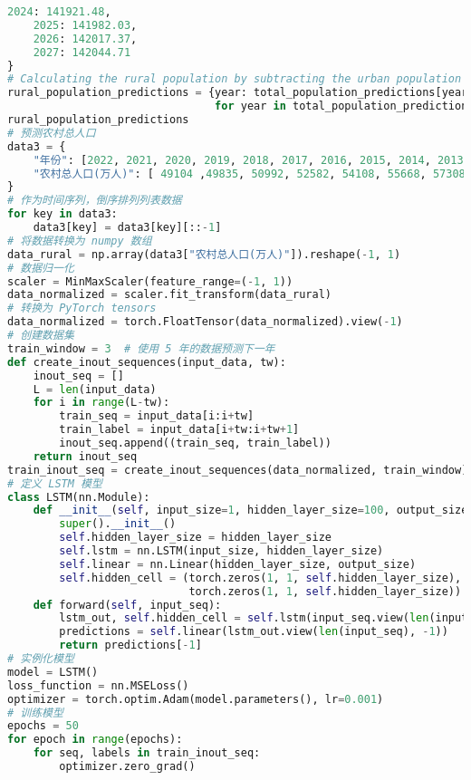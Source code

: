 \begin{lstlisting}[language=python,caption={城乡人口}]
    2024: 141921.48,
    2025: 141982.03,
    2026: 142017.37,
    2027: 142044.71
}
# Calculating the rural population by subtracting the urban population from the total population
rural_population_predictions = {year: total_population_predictions[year] - urban_population_predictions[year] 
                                for year in total_population_predictions}
rural_population_predictions
# 预测农村总人口
data3 = {
    "年份": [2022, 2021, 2020, 2019, 2018, 2017, 2016, 2015, 2014, 2013, 2012, 2011, 2010, 2009, 2008, 2007, 2006, 2005, 2004, 2003, 2002, 2001, 2000, 1999, 1998, 1997, 1996, 1995, 1994, 1993, 1992, 1991, 1990],
    "农村总人口(万人)": [ 49104 ,49835, 50992, 52582, 54108, 55668, 57308, 59024 ,60908, 62224 ,63747 ,64989 ,67113 ,68938 ,70399 ,71496 ,73160 ,74544 ,75705 ,76851 ,78241 ,79563 ,80837 ,82038 ,83153 ,84177 ,85085 ,85947 ,85681 ,85344 ,84996 ,84620, 84138],
}
# 作为时间序列，倒序排列列表数据
for key in data3:
    data3[key] = data3[key][::-1]
# 将数据转换为 numpy 数组
data_rural = np.array(data3["农村总人口(万人)"]).reshape(-1, 1)
# 数据归一化
scaler = MinMaxScaler(feature_range=(-1, 1))
data_normalized = scaler.fit_transform(data_rural)
# 转换为 PyTorch tensors
data_normalized = torch.FloatTensor(data_normalized).view(-1)
# 创建数据集
train_window = 3  # 使用 5 年的数据预测下一年
def create_inout_sequences(input_data, tw):
    inout_seq = []
    L = len(input_data)
    for i in range(L-tw):
        train_seq = input_data[i:i+tw]
        train_label = input_data[i+tw:i+tw+1]
        inout_seq.append((train_seq, train_label))
    return inout_seq
train_inout_seq = create_inout_sequences(data_normalized, train_window)
# 定义 LSTM 模型
class LSTM(nn.Module):
    def __init__(self, input_size=1, hidden_layer_size=100, output_size=1):
        super().__init__()
        self.hidden_layer_size = hidden_layer_size
        self.lstm = nn.LSTM(input_size, hidden_layer_size)
        self.linear = nn.Linear(hidden_layer_size, output_size)
        self.hidden_cell = (torch.zeros(1, 1, self.hidden_layer_size),
                            torch.zeros(1, 1, self.hidden_layer_size))
    def forward(self, input_seq):
        lstm_out, self.hidden_cell = self.lstm(input_seq.view(len(input_seq), 1, -1), self.hidden_cell)
        predictions = self.linear(lstm_out.view(len(input_seq), -1))
        return predictions[-1]
# 实例化模型
model = LSTM()
loss_function = nn.MSELoss()
optimizer = torch.optim.Adam(model.parameters(), lr=0.001)
# 训练模型
epochs = 50
for epoch in range(epochs):
    for seq, labels in train_inout_seq:
        optimizer.zero_grad()

\end{lstlisting}
